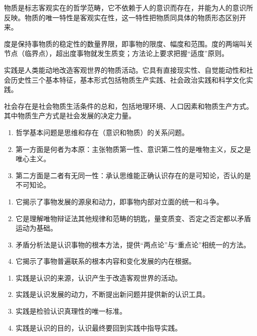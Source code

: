 

\da 物质是标志客观实在的哲学范畴，它不依赖于人的意识而存在，并能为人的意识所反映。物质的唯一特性是客观实在性，这一特性把物质同具体的物质形态区别开来。

\da 度是保持事物质的稳定性的数量界限，即事物的限度、幅度和范围。度的两端叫关节点（临界点），超出度事物就发生质变；方法论上要求把握“适度”原则。

\da 实践是人类能动地改造客观世界的物质活动。它具有直接现实性、自觉能动性和社会历史性三个基本特征，基本形式包括物质生产实践、社会政治实践和科学文化实践。

\da 社会存在是社会物质生活条件的总和，包括地理环境、人口因素和物质生产方式。其中物质生产方式是社会发展的决定力量。


\yaodian
\begin{enumerate}[label=(\arabic*),leftmargin=2.2em,itemsep=2pt,topsep=2pt]
\item 哲学基本问题是思维和存在（意识和物质）的关系问题。
\item 第一方面是何者为本原：主张物质第一性、意识第二性的是唯物主义，反之是唯心主义。
\item 第二方面是二者有无同一性：承认思维能正确认识存在的是可知论，否认的是不可知论。
\end{enumerate}

\yaodian
\begin{enumerate}[label=(\arabic*),leftmargin=2.2em,itemsep=2pt,topsep=2pt]
\item 它揭示了事物发展的源泉和动力，即事物内部对立面的统一和斗争。
\item 它是理解唯物辩证法其他规律和范畴的钥匙，量变质变、否定之否定都以矛盾运动为基础。
\item 矛盾分析法是认识事物的根本方法，提供“两点论”与“重点论”相统一的方法。
\item 它揭示了事物普遍联系的根本内容和变化发展的内在根据。
\end{enumerate}

\yaodian
\begin{enumerate}[label=(\arabic*),leftmargin=2.2em,itemsep=2pt,topsep=2pt]
\item 实践是认识的来源，认识产生于改造客观世界的活动。
\item 实践是认识发展的动力，不断提出新问题并提供新的认识工具。
\item 实践是检验认识真理性的唯一标准。
\item 实践是认识的目的，认识最终要回到实践中指导实践。
\end{enumerate}

